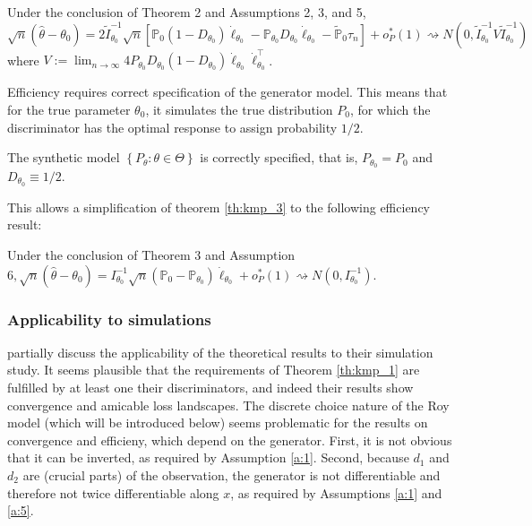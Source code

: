 \begin{theorem}
    \label{th:kmp_3}
    Under the conclusion of Theorem 2 and Assumptions 2, 3, and 5,
    \begin{equation}
        \sqrt{n}\left(\hat{\theta}-\theta_{0}\right)=2 \tilde{I}_{\theta_{0}}^{-1} \sqrt{n}\left[\mathbb{P}_{0}\left(1-D_{\theta_{0}}\right) \dot{\ell}_{\theta_{0}}-\mathbb{P}_{\theta_{0}} D_{\theta_{0}} \dot{\ell}_{\theta_{0}}-\tilde{\mathbb{P}}_{0} \tau_{n}\right]+o_{P}^{*}(1) \rightsquigarrow N\left(0, \tilde{I}_{\theta_{0}}^{-1} V \tilde{I}_{\theta_{0}}^{-1}\right)
    \end{equation}
    where $V:=\lim _{n \rightarrow \infty} 4 P_{\theta_{0}} D_{\theta_{0}}\left(1-D_{\theta_{0}}\right) \dot{\ell}_{\theta_{0}} \dot{\ell}_{\theta_{0}}^{\top}$.\\
\end{theorem}

Efficiency requires correct specification of the generator model.
This means that for the true parameter $\theta_0$, it simulates the true distribution $P_0$, for which the discriminator has the optimal response to assign probability $1/2$. %

\begin{assumption}[A6, KMP]
    The synthetic model $\left\{P_{\theta}: \theta \in \Theta\right\}$ is correctly specified, that is, $P_{\theta_{0}}=P_{0}$ and $D_{\theta_{0}} \equiv 1 / 2$.
\end{assumption}

This allows a simplification of theorem \ref{th:kmp_3} to the following efficiency result:

\begin{theorem}
    Under the conclusion of Theorem 3 and Assumption $6, \sqrt{n}\left(\hat{\theta}-\theta_{0}\right)=I_{\theta_{0}}^{-1} \sqrt{n}\left(\mathbb{P}_{0}-\mathbb{P}_{\theta_{0}}\right) \dot{\ell}_{\theta_{0}}+o_{P}^{*}(1) \rightsquigarrow N\left(0, I_{\theta_{0}}^{-1}\right)$.
\end{theorem}

\subsubsection{Applicability to simulations}
\label{sec:theoerem_simulation}

\textcite{kaji2023adversarial} partially discuss the applicability of the theoretical results to their simulation study.
It seems plausible that the requirements of Theorem \ref{th:kmp_1} are fulfilled by at least one their discriminators, and indeed their results show convergence and amicable loss landscapes.
The discrete choice nature of the Roy model (which will be introduced below) seems problematic for the results on convergence and efficieny, which depend on the generator. %
First, it is not obvious that it can be inverted, as required by Assumption \ref{a:1}.
Second, because $d_1$ and $d_2$ are (crucial parts) of the observation, the generator is not differentiable and therefore not twice differentiable along $x$, as required by Assumptions \ref{a:1} and \ref{a:5}.

